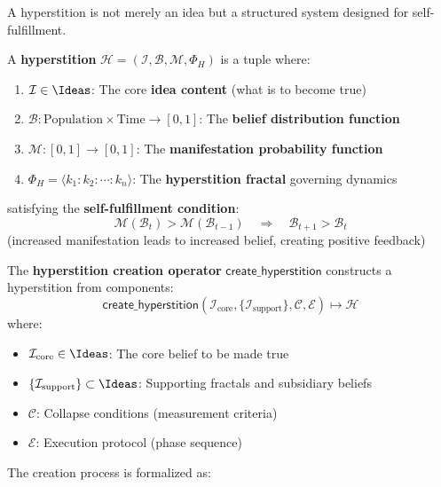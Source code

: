 A hyperstition is not merely an idea but a structured system designed for self-fulfillment.

\begin{definition}[Hyperstition]
\label{def:hyperstition-full}
A \textbf{hyperstition} $\mathcal{H} = (\mathcal{I}, \mathcal{B}, \mathcal{M}, \Phi_H)$ is a tuple where:
\begin{enumerate}[label=(\roman*)]
    \item $\mathcal{I} \in \Ideas$: The core \textbf{idea content} (what is to become true)
    \item $\mathcal{B}: \mathrm{Population} \times \mathrm{Time} \to [0,1]$: The \textbf{belief distribution function}
    \item $\mathcal{M}: [0,1] \to [0,1]$: The \textbf{manifestation probability function}
    \item $\Phi_H = \langle k_1 : k_2 : \cdots : k_n \rangle$: The \textbf{hyperstition fractal} governing dynamics
\end{enumerate}
satisfying the \textbf{self-fulfillment condition}:
\begin{equation}
\boxed{
\mathcal{M}(\mathcal{B}_t) > \mathcal{M}(\mathcal{B}_{t-1}) \quad \Rightarrow \quad \mathcal{B}_{t+1} > \mathcal{B}_t
}
\end{equation}
(increased manifestation leads to increased belief, creating positive feedback)
\end{definition}

\begin{definition}
\label{def:create-hyperstition}
The \textbf{hyperstition creation operator} $\mathsf{create\_hyperstition}$ constructs a hyperstition from components:
\[
\mathsf{create\_hyperstition}(\mathcal{I}_{\text{core}}, \{\mathcal{I}_{\text{support}}\}, \mathcal{C}, \mathcal{E}) \mapsto \mathcal{H}
\]
where:
\begin{itemize}
    \item $\mathcal{I}_{\text{core}} \in \Ideas$: The core belief to be made true
    \item $\{\mathcal{I}_{\text{support}}\} \subset \Ideas$: Supporting fractals and subsidiary beliefs
    \item $\mathcal{C}$: Collapse conditions (measurement criteria)
    \item $\mathcal{E}$: Execution protocol (phase sequence)
\end{itemize}
\end{definition}

The creation process is formalized as:

